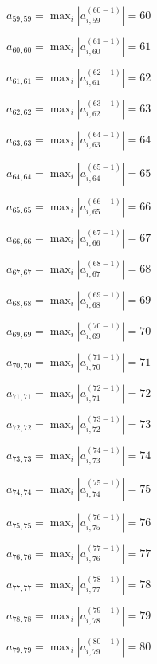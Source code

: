 \documentclass[a4paper,12pt]{article}
\begin{document}
$a _{ 59, 59 } =  \max _i |a _{ i, 59 } ^{ (60 - 1) } | = 60$

$a _{ 60, 60 } =  \max _i |a _{ i, 60 } ^{ (61 - 1) } | = 61$

$a _{ 61, 61 } =  \max _i |a _{ i, 61 } ^{ (62 - 1) } | = 62$

$a _{ 62, 62 } =  \max _i |a _{ i, 62 } ^{ (63 - 1) } | = 63$

$a _{ 63, 63 } =  \max _i |a _{ i, 63 } ^{ (64 - 1) } | = 64$

$a _{ 64, 64 } =  \max _i |a _{ i, 64 } ^{ (65 - 1) } | = 65$

$a _{ 65, 65 } =  \max _i |a _{ i, 65 } ^{ (66 - 1) } | = 66$

$a _{ 66, 66 } =  \max _i |a _{ i, 66 } ^{ (67 - 1) } | = 67$

$a _{ 67, 67 } =  \max _i |a _{ i, 67 } ^{ (68 - 1) } | = 68$

$a _{ 68, 68 } =  \max _i |a _{ i, 68 } ^{ (69 - 1) } | = 69$

$a _{ 69, 69 } =  \max _i |a _{ i, 69 } ^{ (70 - 1) } | = 70$

$a _{ 70, 70 } =  \max _i |a _{ i, 70 } ^{ (71 - 1) } | = 71$

$a _{ 71, 71 } =  \max _i |a _{ i, 71 } ^{ (72 - 1) } | = 72$

$a _{ 72, 72 } =  \max _i |a _{ i, 72 } ^{ (73 - 1) } | = 73$

$a _{ 73, 73 } =  \max _i |a _{ i, 73 } ^{ (74 - 1) } | = 74$

$a _{ 74, 74 } =  \max _i |a _{ i, 74 } ^{ (75 - 1) } | = 75$

$a _{ 75, 75 } =  \max _i |a _{ i, 75 } ^{ (76 - 1) } | = 76$

$a _{ 76, 76 } =  \max _i |a _{ i, 76 } ^{ (77 - 1) } | = 77$

$a _{ 77, 77 } =  \max _i |a _{ i, 77 } ^{ (78 - 1) } | = 78$

$a _{ 78, 78 } =  \max _i |a _{ i, 78 } ^{ (79 - 1) } | = 79$

$a _{ 79, 79 } =  \max _i |a _{ i, 79 } ^{ (80 - 1) } | = 80$
\end{document}
